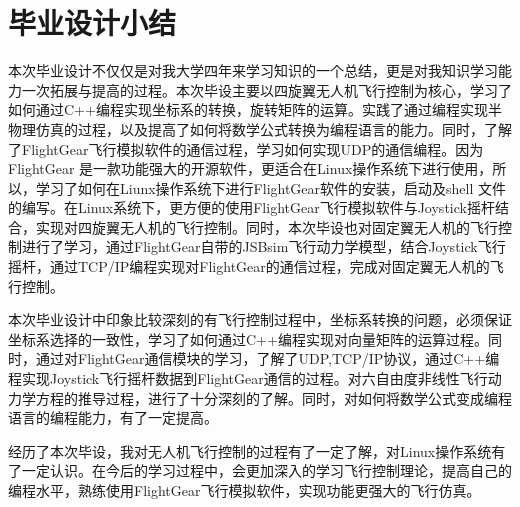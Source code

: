 \chapter*{毕业设计小结}

本次毕业设计不仅仅是对我大学四年来学习知识的一个总结，更是对我知识学习能力一次拓展与提高的过程。本次毕设主要以四旋翼无人机飞行控制为核心，学习了如何通过C++编程实现坐标系的转换，旋转矩阵的运算。实践了通过编程实现半物理仿真的过程，以及提高了如何将数学公式转换为编程语言的能力。同时，了解了FlightGear飞行模拟软件的通信过程，学习如何实现UDP的通信编程。因为FlightGear 是一款功能强大的开源软件，更适合在Linux操作系统下进行使用，所以，学习了如何在Liunx操作系统下进行FlightGear软件的安装，启动及shell 文件的编写。在Linux系统下，更方便的使用FlightGear飞行模拟软件与Joystick摇杆结合，实现对四旋翼无人机的飞行控制。同时，本次毕设也对固定翼无人机的飞行控制进行了学习，通过FlightGear自带的JSBsim飞行动力学模型，结合Joystick飞行摇杆，通过TCP/IP编程实现对FlightGear的通信过程，完成对固定翼无人机的飞行控制。

本次毕业设计中印象比较深刻的有飞行控制过程中，坐标系转换的问题，必须保证坐标系选择的一致性，学习了如何通过C++编程实现对向量矩阵的运算过程。同时，通过对FlightGear通信模块的学习，了解了UDP,TCP/IP协议，通过C++编程实现Joystick飞行摇杆数据到FlightGear通信的过程。对六自由度非线性飞行动力学方程的推导过程，进行了十分深刻的了解。同时，对如何将数学公式变成编程语言的编程能力，有了一定提高。

经历了本次毕设，我对无人机飞行控制的过程有了一定了解，对Linux操作系统有了一定认识。在今后的学习过程中，会更加深入的学习飞行控制理论，提高自己的编程水平，熟练使用FlightGear飞行模拟软件，实现功能更强大的飞行仿真。


